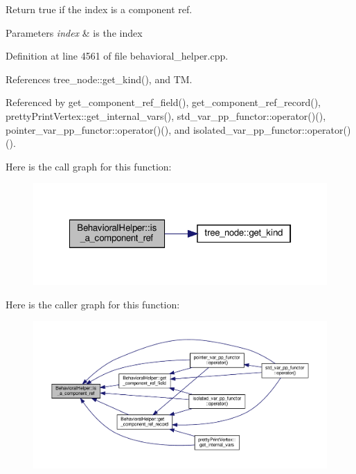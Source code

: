 Return true if the index is a component ref. 


\begin{DoxyParams}{Parameters}
{\em index} & is the index \\
\hline
\end{DoxyParams}


Definition at line 4561 of file behavioral\+\_\+helper.\+cpp.



References tree\+\_\+node\+::get\+\_\+kind(), and TM.



Referenced by get\+\_\+component\+\_\+ref\+\_\+field(), get\+\_\+component\+\_\+ref\+\_\+record(), pretty\+Print\+Vertex\+::get\+\_\+internal\+\_\+vars(), std\+\_\+var\+\_\+pp\+\_\+functor\+::operator()(), pointer\+\_\+var\+\_\+pp\+\_\+functor\+::operator()(), and isolated\+\_\+var\+\_\+pp\+\_\+functor\+::operator()().

Here is the call graph for this function\+:
\nopagebreak
\begin{figure}[H]
\begin{center}
\leavevmode
\includegraphics[width=322pt]{dd/db2/classBehavioralHelper_a4f81293e41ce4964ead8957f6bc4879e_cgraph}
\end{center}
\end{figure}
Here is the caller graph for this function\+:
\nopagebreak
\begin{figure}[H]
\begin{center}
\leavevmode
\includegraphics[width=350pt]{dd/db2/classBehavioralHelper_a4f81293e41ce4964ead8957f6bc4879e_icgraph}
\end{center}
\end{figure}
\mbox{\label{classBehavioralHelper_add58a0a0e9c70eb7c38fd9b65576ca90}} 
